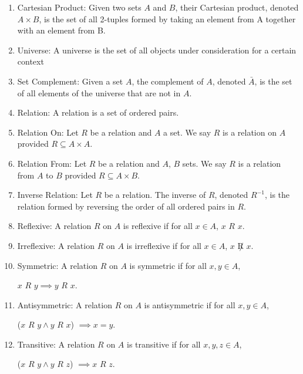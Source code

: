 \documentclass{article}
\begin{document}
\begin{enumerate}
		\item Cartesian Product: Given two sets $A$ and $B$, their Cartesian product, denoted $A\times B$, is the set of all 2-tuples formed by taking an element from A together with an element from B.
		
		\item Universe: A universe is the set of all objects under consideration for a certain context
		
		\item Set Complement: Given a set $A$, the complement of $A$, denoted $\bar A$, is the set of all elements of the universe that are not in $A$.
		
		\item Relation: A relation is a set of ordered pairs.
		
		\item Relation On: Let $R$ be a relation and $A$ a set.
		We say $R$ is a relation on $A$ provided $R\subseteq A\times A$.
		
		\item Relation From: Let $R$ be a relation and $A$, $B$ sets.
		We say $R$ is a relation from $A$ to $B$ provided $R\subseteq A\times B$.
		
		\item Inverse Relation: Let $R$ be a relation.
		The inverse of $R$, denoted $R^{-1}$, is the relation formed by reversing the order of all ordered pairs in $R$.
		
		\item Reflexive: A relation $R$ on $A$ is reflexive if for all $x\in A$, $x$ $R$ $x$.
		
		\item Irreflexive: A relation $R$ on $A$ is irreflexive if for all $x\in A$, $x$ $\not R$ $x$.
		
		\item Symmetric: A relation $R$ on $A$ is symmetric if for all $x,y\in A$,
		
		$x$ $R$ $y\implies y$ $R$ $x$.
		
		\item Antisymmetric: A relation $R$ on $A$ is antisymmetric if for all $x,y\in A$,
		
		($x$ $R$ $y\wedge y$ $R$ $x$) $\implies x=y$.
		
		\item Transitive: A relation $R$ on $A$ is transitive if for all $x,y,z\in A$,
		
		($x$ $R$ $y\wedge y$ $R$ $z$) $\implies x$ $R$ $z$.
		

\end{enumerate}
\end{document}
